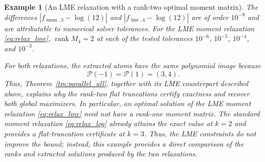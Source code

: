 \documentclass[pdflatex,sn-mathphys-num]{sn-jnl}%
\theoremstyle{thmstyleone}%
\theoremstyle{thmstyletwo}%
\newtheorem{example}{Example}%
\theoremstyle{thmstylethree}%
\begin{document}
{\begin{example}[An LME relaxation with a rank-two optimal moment matrix]
The differences $|f_{\operatorname{mom},3}-\log(12)|$ and
$|f_{\operatorname{lme},4}-\log(12)|$ are of order $10^{-9}$ and are
attributable to numerical solver tolerances.
For the LME moment relaxation \eqref{eq:relax_lme},
$\operatorname{rank}M_4=2$ at each of the tested tolerances
$10^{-6}$, $10^{-5}$, $10^{-4}$, and $10^{-3}$.

For both relaxations, the extracted atoms have the same polynomial
image because
\[
\mathcal{P}(-1)=\mathcal{P}(1)=(3,4).
\]
Thus, Theorem~\ref{tm:parallel_all}, together with its LME counterpart
described above, explains why the rank-two flat truncations certify
exactness and recover both global maximizers. In particular, an optimal
solution of the LME moment relaxation \eqref{eq:relax_lme} need not
have a rank-one moment matrix.
The standard moment relaxation \eqref{eq:relax_log} already attains
the exact value at $k=2$ and provides a flat-truncation certificate at
$k=3$. Thus, the LME constraints do not improve the bound; instead,
this example provides a direct comparison of the ranks and extracted
solutions produced by the two relaxations.
\end{example}
}
\end{document}
